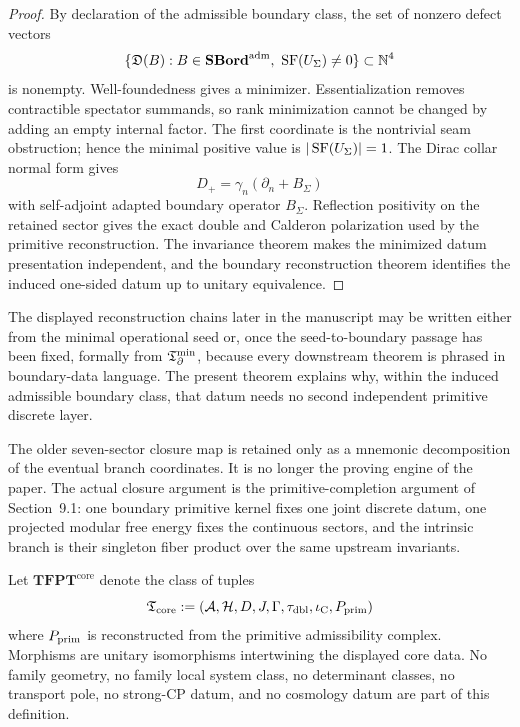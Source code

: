 \begin{proof}
By declaration of the admissible boundary class, the set of nonzero defect vectors
\begin{equation}
\{\mathfrak D(B):B\in\mathbf{SBord}^{\mathrm{adm}},\ \SF(U_\Sigma)\neq0\}\subset\mathbb N^4
\end{equation}
is nonempty. Well-foundedness gives a minimizer. Essentialization removes contractible spectator
summands, so rank minimization cannot be changed by adding an empty internal factor. The first
coordinate is the nontrivial seam obstruction; hence the minimal positive value is
$|\operatorname{SF}(U_\Sigma)|=1$. The Dirac collar normal form gives
\begin{equation}
D_+=\gamma_n(\partial_n+B_\Sigma)
\end{equation}
with self-adjoint adapted boundary operator $B_\Sigma$. Reflection positivity on the retained
sector gives the exact double and Calderon polarization used by the primitive reconstruction. The
invariance theorem makes the minimized datum presentation independent, and the boundary
reconstruction theorem identifies the induced one-sided datum up to unitary equivalence.
\end{proof}
\begin{remark}
The displayed reconstruction chains later in the manuscript may be written either from the minimal
operational seed or, once the seed-to-boundary passage has been fixed, formally from $\mathfrak T_{\partial}^{\min}$,
because every downstream theorem is phrased in boundary-data language. The present theorem explains
why, within the induced admissible boundary class, that datum needs no second independent primitive
discrete layer.
\end{remark}

\begin{remark}
The older seven-sector closure map is retained only as a mnemonic decomposition of the eventual
branch coordinates. It is no longer the proving engine of the paper. The actual closure argument is
the primitive-completion argument of Section~9.1: one boundary primitive kernel fixes one joint
discrete datum, one projected modular free energy fixes the continuous sectors, and the intrinsic
branch is their singleton fiber product over the same upstream invariants.
\end{remark}

\begin{definition}
\label{def:tfpt-core-class}
Let $\mathbf{TFPT}^{\mathrm{core}}$ denote the class of tuples
\[
\mathfrak T_{\mathrm{core}}:=(\mathcal A,\mathcal H,D,J,\Gamma,\tau_{\mathrm{dbl}},\iota_{\mathrm C},P_{\mathrm{prim}})
\]
where $P_{\mathrm{prim}}$ is reconstructed from the primitive admissibility complex. Morphisms are unitary
isomorphisms intertwining the displayed core data. No family geometry, no family local system
class, no determinant classes, no transport pole, no strong-CP datum, and no cosmology datum are
part of this definition.
\end{definition}

